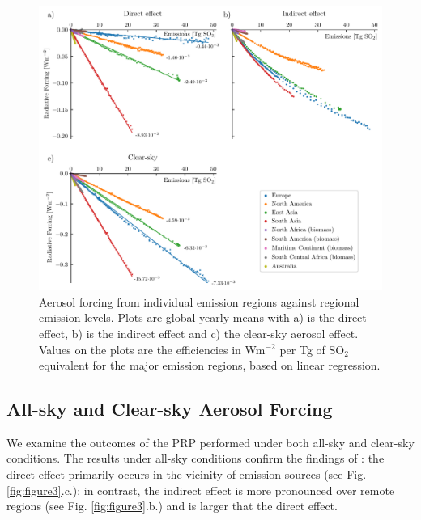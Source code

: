 \documentclass[draft]{agujournal2019}
\begin{document}
      \begin{figure}
            \centering
            \includegraphics[width=\textwidth]{../../figures/figure2}
            \caption{Aerosol forcing from individual emission regions against regional emission levels. Plots are global yearly means with a) is the direct effect, b) is the indirect effect and c) the clear-sky aerosol effect. Values on the plots are the efficiencies in Wm$^{-2}$ per Tg of SO$_2$ equivalent for the major emission regions, based on linear regression.}
      \label{fig:figure2}
      \end{figure}

      \subsection{All-sky and Clear-sky Aerosol Forcing}\label{sec:clear-sky}
            We examine the outcomes of the PRP performed under both all-sky and clear-sky conditions. The results under all-sky conditions confirm the findings of : the direct effect primarily occurs in the vicinity of emission sources (see Fig. \ref{fig:figure3}.c.); in contrast, the indirect effect is more pronounced over remote regions (see Fig. \ref{fig:figure3}.b.) and is larger that the direct effect.
            
\end{document}
